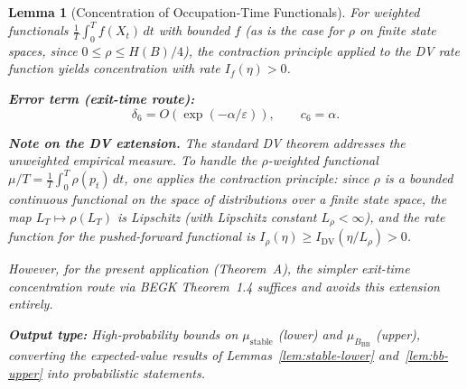 \documentclass[11pt]{article}
\newtheorem{lemma}{Lemma}
\newcommand{\eps}{\varepsilon}
\newcommand{\BBB}{B_{\mathrm{BB}}}
\begin{document}
\begin{lemma}[Concentration of Occupation-Time Functionals]
For weighted functionals $\frac{1}{T}\int_0^T f(X_t)\, dt$ with
bounded $f$ (as is the case for $\rho$ on finite state spaces, since
$0 \leq \rho \leq H(B)/4$), the contraction principle applied to
the DV rate function yields concentration with rate $I_f(\eta) > 0$.

\medskip
\textbf{Error term (exit-time route):}
\begin{equation}\label{eq:delta6}
  \delta_6 = O(\exp(-\alpha/\eps)),
  \qquad c_6 = \alpha.
\end{equation}

\medskip
\textbf{Note on the DV extension.}
The standard DV theorem addresses the unweighted empirical measure.
To handle the $\rho$-weighted functional
$\mu/T = \frac{1}{T}\int_0^T \rho(p_t)\, dt$, one applies the
contraction principle: since $\rho$ is a bounded continuous functional
on the space of distributions over a finite state space, the map
$L_T \mapsto \rho(L_T)$ is Lipschitz (with Lipschitz constant
$L_\rho < \infty$), and the rate function for the pushed-forward
functional is
$I_\rho(\eta) \geq I_{\mathrm{DV}}(\eta / L_\rho) > 0$.

However, for the present application (Theorem~A), the simpler
exit-time concentration route via BEGK Theorem~1.4 suffices and
avoids this extension entirely.

\medskip
\textbf{Output type:}
High-probability bounds on $\mu_{\mathrm{stable}}$ (lower) and
$\mu_\BBB$ (upper), converting the expected-value results of
Lemmas~\ref{lem:stable-lower} and~\ref{lem:bb-upper} into
probabilistic statements.
\end{lemma}
\end{document}
